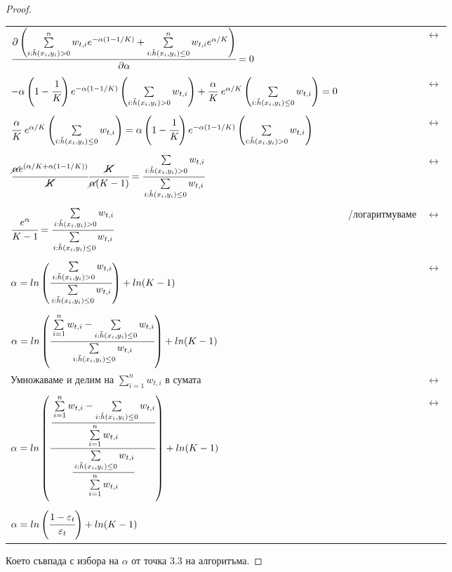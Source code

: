 \documentclass[main.tex]{subfiles}
\begin{document}
\begin{proof}
\begin{tabular}{l c l}
	$\cfrac{\partial\left(\sum\limits_{i: \tilde{h}(x_i, y_i) > 0}^n w_{t, i} e^{-\alpha(1 - 1/K)} + \sum\limits_{i: \tilde{h}(x_i, y_i) \leq 0}^n w_{t, i} e^{\alpha/K}\right)}{\partial \alpha} = 0$ & & $\longleftrightarrow$ \\
	\\
	$-\alpha\B{1 - \cfrac{1}{K}}e^{-\alpha(1 - 1/K)}\B{\sum\limits_{i:\tilde{h}(x_i, y_i) > 0} w_{t, i}} + \cfrac{\alpha}{K}\ e^{\alpha/K}\B{\sum\limits_{i:\tilde{h}(x_i, y_i) \leq 0} w_{t, i}} = 0$ & & $\longleftrightarrow$\\
	\\
	$\cfrac{\alpha}{K}\ e^{\alpha/K}\B{\sum\limits_{i:\tilde{h}(x_i, y_i) \leq 0} w_{t, i}} = \alpha\B{1 - \cfrac{1}{K}}e^{-\alpha(1 - 1/K)}\B{\sum\limits_{i:\tilde{h}(x_i, y_i) > 0} w_{t, i}}$ & &$\longleftrightarrow$\\
	\\
	$\cfrac{\cancel{\alpha}e^{(\alpha/K + \alpha(1 - 1/K))}}{\cancel{K}}\cfrac{\cancel{K}}{\cancel{\alpha}(K - 1)} = \cfrac{\sum\limits_{i:\tilde{h}(x_i, y_i) > 0} w_{t, i}}{\sum\limits_{i:\tilde{h}(x_i, y_i) \leq 0} w_{t, i}}$ & & $\longleftrightarrow$\\
	\\ 
	$\cfrac{e^{\alpha}}{K-1} = \cfrac{\sum\limits_{i:\tilde{h}(x_i, y_i) > 0} w_{t, i}}{\sum\limits_{i:\tilde{h}(x_i, y_i) \leq 0} w_{t, i}}$ & /логаритмуваме & $\longleftrightarrow$\\
	\\  
	$\alpha = ln\left(\cfrac{\sum\limits_{i:\tilde{h}(x_i, y_i) > 0} w_{t, i}}{\sum\limits_{i:\tilde{h}(x_i, y_i) \leq 0} w_{t, i}}\right) + ln(K - 1)$ & &$\longleftrightarrow$\\
	\\
	$\alpha = ln\left(\cfrac{\sum\limits_{i=1}^n w_{t, i} - \sum\limits_{i:\tilde{h}(x_i, y_i) \leq 0} w_{t, i}}{\sum\limits_{i:\tilde{h}(x_i, y_i) \leq 0} w_{t, i}}\right) + ln(K - 1)$ & & \\
	Умножаваме и делим на $\sum\limits_{i=1}^n w_{t, i}$ в сумата &  &$\longleftrightarrow$\\
	\\
	$\alpha = ln\left(\cfrac{\cfrac{\sum\limits_{i=1}^n w_{t, i} - \sum\limits_{i:\tilde{h}(x_i, y_i) \leq 0} w_{t, i}}{\sum\limits_{i=1}^n w_{t, i}}}{\cfrac{\sum\limits_{i:\tilde{h}(x_i, y_i) \leq 0} w_{t, i}}{\sum\limits_{i=1}^n w_{t, i}}} \right) + ln(K - 1)$ & & $\longleftrightarrow$\\
	\\
	$\alpha = ln \left(\cfrac{1 - \varepsilon_t}{\varepsilon_t}\right) + ln(K-1)$
\end{tabular}

Което съвпада с избора на $\alpha$ от точка 3.3 на алгоритъма.
\end{proof}
\end{document}
